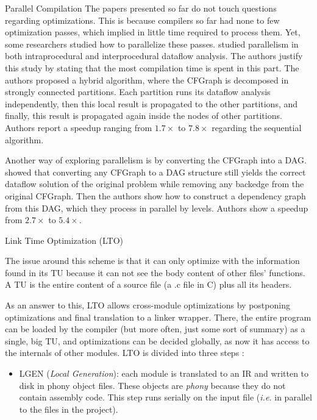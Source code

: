 \begin{section}{Parallel Compilation}
The papers presented so far do not touch questions regarding optimizations.
This is because compilers so far had none to few optimization passes, which
implied in little time required to process them. Yet, some researchers studied
how to parallelize these passes. \cite{Lee1994} studied parallelism in both
intraprocedural and interprocedural dataflow analysis. The authors justify this
study by stating that the most compilation time is spent in this part. The
authors proposed a hybrid algorithm, where the CFGraph is decomposed in
strongly connected partitions. Each partition runs its dataflow analysis
independently, then this local result is propagated to the other partitions,
and finally, this result is propagated again inside the nodes of other
partitions. Authors report a speedup ranging from $1.7\times$ to $7.8\times$
regarding the sequential algorithm.

Another way of exploring parallelism is by converting the CFGraph into a DAG.
\cite{kramer1994combining} showed that converting any CFGraph to a DAG
structure still yields the correct dataflow solution of the original problem
while removing any backedge from the original CFGraph. Then the authors show
how to construct a dependency graph from this DAG, which they process in
parallel by levels. Authors show a speedup from $2.7\times$ to $5.4\times$.


\begin{subsection}{Link Time Optimization (LTO)}\label{lto_section}

The issue around this scheme is that it can only optimize with
the information found in its TU because it can not see the body
content of other files' functions. A TU is the
entire content of a source file (a .c file in C) plus all its headers.

As an answer to this, LTO allows cross-module optimizations by
postponing optimizations and final translation to a linker wrapper. There, the entire
program can be loaded by the compiler (but more often, just some sort of summary)
as a single, big TU, and optimizations can be decided globally,
as now it has access to the internals of other modules. LTO is divided into
three steps \citep{whoprgoogle,glek2010optimizing}:
\begin{itemize}
\item LGEN (\textit{Local Generation}): each module is translated to an IR and
written to disk in phony object files. These objects are \emph{phony} because
they do not contain assembly code. This step runs serially on the input file
(\textit{i.e.} in parallel to the files in the project).


\end{itemize}
\end{subsection}
\end{section}
